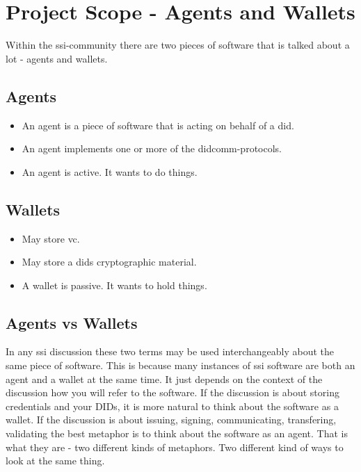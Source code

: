 \newpage



\section{Project Scope - Agents and Wallets}

Within the \acrshort{ssi}-community there are two pieces of software that is talked about a lot - agents and wallets.


\subsection{Agents}

\begin{itemize}
    \item An agent is a piece of software that is acting on behalf of a \acrshort{did}.
    \item An agent implements one or more of the \acrshort{didcomm}-protocols.
    \item An agent is active. It wants to do things.
\end{itemize}


\subsection{Wallets}

\begin{itemize}
    \item May store \acrfull{vc}.
    \item May store a \acrshort{did}s cryptographic material.
    \item A wallet is passive. It wants to hold things.
\end{itemize}

\subsection{Agents vs Wallets}

In any \acrshort{ssi} discussion these two terms may be used interchangeably about the same piece of software. This is because many instances of \acrshort{ssi} software are both an agent and a wallet at the same time. It just depends on the context of the discussion how you will refer to the software. If the discussion is about storing credentials and your DIDs, it is more natural to think about the software as a wallet. If the discussion is about issuing, signing, communicating, transfering, validating the best metaphor is to think about the software as an agent. That is what they are - two different kinds of metaphors. Two different kind of ways to look at the same thing.




